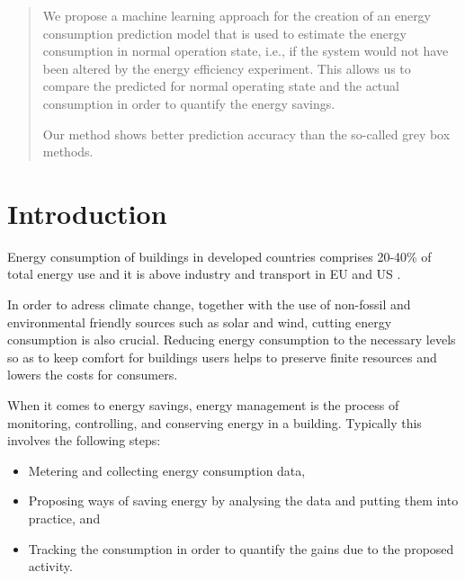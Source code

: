 \documentclass[3p,times,procedia]{elsarticle}
\begin{document}
\begin{frontmatter}
\begin{abstract}
We propose a machine learning approach for the creation of an energy consumption prediction model that is used to estimate the energy consumption in normal operation state, i.e., if the  system would not have been altered by the energy efficiency experiment. This allows us to compare the predicted for normal operating state and the actual consumption in order to quantify the energy savings.

Our method shows better prediction accuracy than the so-called grey box methods.



\end{abstract}

\begin{keyword}



\end{keyword}

\end{frontmatter}


\section{Introduction}
\label{intro}

Energy consumption of buildings in developed countries comprises 20-40\% of total energy use and it is above industry and transport in EU and US \cite{perez2008review}. 

In order to adress climate change, together with the use of non-fossil and environmental friendly sources such as solar and wind, cutting energy consumption is also crucial. Reducing energy consumption to the necessary levels so as to keep comfort for buildings users helps to preserve finite resources and lowers the costs for consumers.

When it comes to energy savings, energy management is the process of monitoring, controlling, and conserving energy in a building. Typically this involves the following steps:

\begin{itemize}
\item Metering and collecting energy consumption data,
\item Proposing ways of saving energy by analysing the data and putting them into practice, and
\item Tracking the consumption in order to quantify the gains due to the proposed activity.
\end{itemize}
\end{document}
